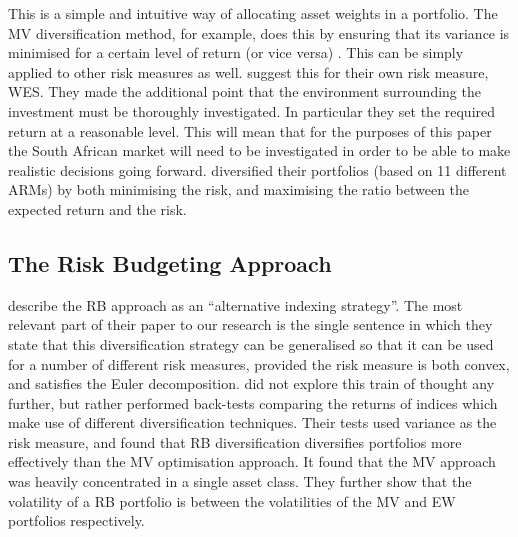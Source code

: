 \documentclass[12pt,a4paper]{article}
\begin{document}
This is a simple and intuitive way of allocating asset weights in a portfolio. The MV diversification method, for example, does this by ensuring that its variance is minimised for a certain level of return (or vice versa) \citep{markowitz1952portfolio}. This can be simply applied to other risk measures as well. \cite{CHEN20111777} suggest this for their own risk measure, WES. They made the additional point that the environment surrounding the investment must be thoroughly investigated. In particular they set the required return at a reasonable level. This will mean that for the purposes of this paper the South African market will need to be investigated in order to be able to make realistic decisions going forward. \cite{righi2017simulation} diversified their portfolios (based on 11 different ARMs) by both minimising the risk, and maximising the ratio between the expected return and the risk.

\subsection{The Risk Budgeting Approach}
\label{subsec:RB} 

\cite{bruder2012managing} describe the RB approach as an ``alternative indexing strategy''. The most relevant part of their paper to our research is the single sentence in which they state that this diversification strategy can be generalised so that it can be used for a number of different risk measures, provided the risk measure is both convex, and satisfies the Euler decomposition. \cite{bruder2012managing} did not explore this train of thought any further, but rather performed back-tests comparing the returns of indices which make use of different diversification techniques. Their tests used variance as the risk measure, and found that RB diversification diversifies portfolios more effectively than the MV optimisation approach. It found that the MV approach was heavily concentrated in a single asset class. They further show that the volatility of a RB portfolio is between the volatilities of the MV and EW portfolios respectively.
\end{document}

